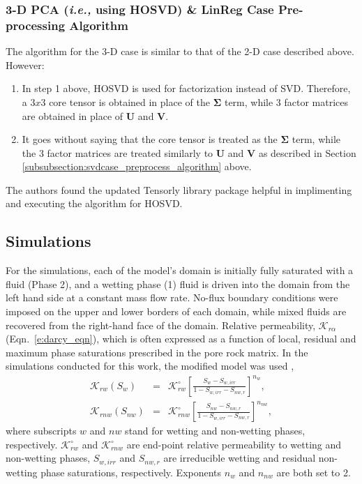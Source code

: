 \documentclass[preprint,12pt]{elsarticle}
\newcommand{\frc}{\displaystyle\frac}
\newcommand{\ie}{{\it i.e., }}
\begin{document}
\subsubsection{3-D PCA (\ie{using HOSVD}) \& LinReg Case Pre-processing Algorithm}\label{subsubsection:hosvdcase_preprocess_algorithm}
The algorithm for the 3-D case is similar to that of the 2-D case described above. However:
\begin{enumerate}[1.]
\item In step 1 above, HOSVD is used for factorization instead of SVD. Therefore, a $3 x 3$ core tensor is obtained in place of the $\mathbf{\Sigma}$ term, while 3 factor matrices are obtained in place of $\mathbf{U}$ and $\mathbf{V}$.
  \item It goes without saying that the core tensor is treated as the $\mathbf{\Sigma}$ term, while the 3 factor matrices are treated similarly to $\mathbf{U}$ and $\mathbf{V}$ as described in Section \ref{subsubsection:svdcase_preprocess_algorithm} above.
\end{enumerate}
The authors found the updated Tensorly library package \cite{Tensorly_2018} helpful in implimenting and executing the algorithm for HOSVD.

\subsection{Simulations}\label{subsection:simulations}
For the simulations, each of the model's domain is initially fully saturated with a fluid (Phase 2), and a wetting phase (1) fluid is driven into the domain from the left hand side at a constant mass flow rate. No-flux boundary conditions were imposed on the upper and lower borders of each domain, while mixed fluids are recovered from the right-hand face of the domain. Relative permeability, $\mathcal{K}_{r\alpha}$ (Eqn.~\ref{e:darcy_eqn}), which is often expressed as a function of local, residual and maximum phase saturations prescribed in the pore rock matrix. In the simulations conducted for this work, the modified \citet{Brooks_1964} model was used \citep{alpak_1999},
\begin{eqnarray}
  \mathcal{K}_{rw}\left(S_{w}\right) &=& \mathcal{K}^{\circ}_{rw}\left[\frc{S_{w}-S_{w,irr}}{1-S_{w,irr}-S_{nw,r}}\right]^{n_{w}}, \label{Eqn:CoreyBrooks1}\\
  \mathcal{K}_{rnw}\left(S_{nw}\right) &=& \mathcal{K}^{\circ}_{rnw}\left[\frc{S_{nw}-S_{nw,r}}{1-S_{w,irr}-S_{nw,r}}\right]^{n_{nw}}, \label{Eqn:CoreyBrooks2}
\end{eqnarray}
where subscripts $w$ and $nw$ stand for wetting and non-wetting phases, respectively. $\mathcal{K}^{\circ}_{rw}$ and $\mathcal{K}^{\circ}_{rnw}$ are end-point relative permeability to wetting and non-wetting phases, $S_{w,irr}$ and $S_{nw,r}$ are irreducible wetting and residual non-wetting phase saturations, respectively. Exponents $n_{w}$ and $n_{nw}$ are both set to 2.
\end{document}
